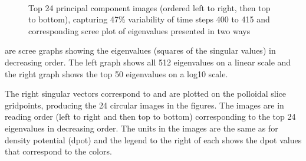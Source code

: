 \begin{figure}[tbp]
  \begin{center}
    \\
    \\
    \\
    \\
    \\
    \\
    \caption{Top 24 principal component images (ordered left to right,
      then top to bottom), capturing 47\% variability of time steps
      400 to 415 and corresponding scree plot of eigenvalues presented
      in two ways}
  \label{fig:400}
  \end{center}
\end{figure}
are scree graphs showing the eigenvalues (squares of
the singular values) in decreasing order. The left graph shows all 512
eigenvalues on a linear scale and the right graph shows the top 50
eigenvalues on a log10 scale.

The right singular vectors correspond to and are plotted on the
polloidal slice gridpoints, producing the 24 circular images in the
figures. The images are in reading order (left to right and then top to
bottom) corresponding to the top 24 eigenvalues in decreasing order. The units
in the images are the same as for density potential (dpot)
and the legend to the
right of each shows the dpot values that correspond to the colors.

